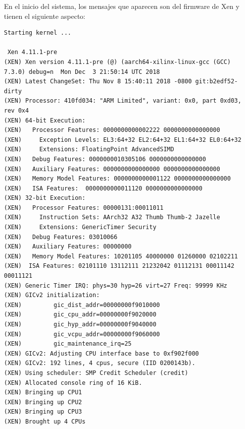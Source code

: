 En el inicio del sistema, los mensajes que aparecen son del firmware de Xen y tienen el siguiente aspecto:
\begin{lstlisting}[style=CStyle]
Starting kernel ...

 Xen 4.11.1-pre
(XEN) Xen version 4.11.1-pre (@) (aarch64-xilinx-linux-gcc (GCC) 7.3.0) debug=n  Mon Dec  3 21:50:14 UTC 2018
(XEN) Latest ChangeSet: Thu Nov 8 15:40:11 2018 -0800 git:b2edf52-dirty
(XEN) Processor: 410fd034: "ARM Limited", variant: 0x0, part 0xd03, rev 0x4
(XEN) 64-bit Execution:
(XEN)   Processor Features: 0000000000002222 0000000000000000
(XEN)     Exception Levels: EL3:64+32 EL2:64+32 EL1:64+32 EL0:64+32
(XEN)     Extensions: FloatingPoint AdvancedSIMD
(XEN)   Debug Features: 0000000010305106 0000000000000000
(XEN)   Auxiliary Features: 0000000000000000 0000000000000000
(XEN)   Memory Model Features: 0000000000001122 0000000000000000
(XEN)   ISA Features:  0000000000011120 0000000000000000
(XEN) 32-bit Execution:
(XEN)   Processor Features: 00000131:00011011
(XEN)     Instruction Sets: AArch32 A32 Thumb Thumb-2 Jazelle
(XEN)     Extensions: GenericTimer Security
(XEN)   Debug Features: 03010066
(XEN)   Auxiliary Features: 00000000
(XEN)   Memory Model Features: 10201105 40000000 01260000 02102211
(XEN)  ISA Features: 02101110 13112111 21232042 01112131 00011142 00011121
(XEN) Generic Timer IRQ: phys=30 hyp=26 virt=27 Freq: 99999 KHz
(XEN) GICv2 initialization:
(XEN)         gic_dist_addr=00000000f9010000
(XEN)         gic_cpu_addr=00000000f9020000
(XEN)         gic_hyp_addr=00000000f9040000
(XEN)         gic_vcpu_addr=00000000f9060000
(XEN)         gic_maintenance_irq=25
(XEN) GICv2: Adjusting CPU interface base to 0xf902f000
(XEN) GICv2: 192 lines, 4 cpus, secure (IID 0200143b).
(XEN) Using scheduler: SMP Credit Scheduler (credit)
(XEN) Allocated console ring of 16 KiB.
(XEN) Bringing up CPU1
(XEN) Bringing up CPU2
(XEN) Bringing up CPU3
(XEN) Brought up 4 CPUs
\end{lstlisting}
